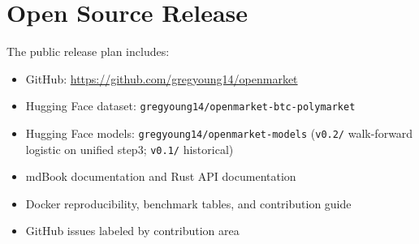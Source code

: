 \section{Open Source Release}
\label{sec:release}

The public release plan includes:
\begin{itemize}
  \item GitHub: \url{https://github.com/gregyoung14/openmarket}
  \item Hugging Face dataset: \texttt{gregyoung14/openmarket-btc-polymarket}
  \item Hugging Face models: \texttt{gregyoung14/openmarket-models}
        (\texttt{v0.2/} walk-forward logistic on unified step3; \texttt{v0.1/}
        historical)
  \item mdBook documentation and Rust API documentation
  \item Docker reproducibility, benchmark tables, and contribution guide
  \item GitHub issues labeled by contribution area
\end{itemize}